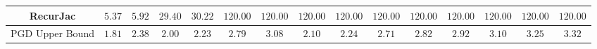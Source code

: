 \begin{table*}
{\begin{tabular}{c|c|c|c|c|c|c|c|c|c|c|c|c|c|c}
     RecurJac &        $5.37$ &        $5.92$ &       $29.40$ &       $30.22$ &      $120.00$ &      $120.00$ &      $120.00$ &      $120.00$ &      $120.00$ &      $120.00$ &      $120.00$ &      $120.00$ &      $120.00$ &      $120.00$ \\
\hline
PGD Upper Bound &        $1.81$ &        $2.38$ &        $2.00$ &        $2.23$ &        $2.79$ &        $3.08$ &        $2.10$ &        $2.24$ &        $2.71$ &        $2.82$ &        $2.92$ &        $3.10$ &        $3.25$ &        $3.32$ \\
\bottomrule

    \end{tabular}
    }
    \label{tab:exp-A-mnist-radius-time}
\end{table*}

